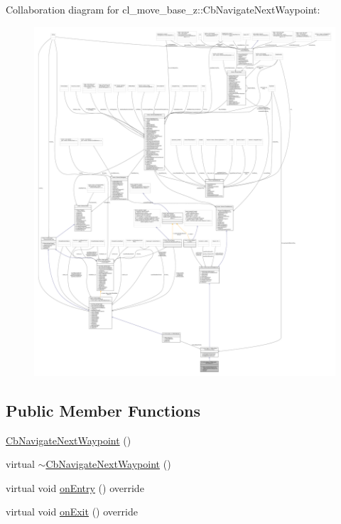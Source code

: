 Collaboration diagram for cl\+\_\+move\+\_\+base\+\_\+z\+:\+:Cb\+Navigate\+Next\+Waypoint\+:
\nopagebreak
\begin{figure}[H]
\begin{center}
\leavevmode
\includegraphics[width=350pt]{classcl__move__base__z_1_1CbNavigateNextWaypoint__coll__graph}
\end{center}
\end{figure}
\subsection*{Public Member Functions}
\begin{DoxyCompactItemize}
\item 
\hyperlink{classcl__move__base__z_1_1CbNavigateNextWaypoint_ae76bae37ab364bf6f48b8a200dd63ced}{Cb\+Navigate\+Next\+Waypoint} ()
\item 
virtual \hyperlink{classcl__move__base__z_1_1CbNavigateNextWaypoint_a35a4ab32307256f3e0a6433efb336227}{$\sim$\+Cb\+Navigate\+Next\+Waypoint} ()
\item 
virtual void \hyperlink{classcl__move__base__z_1_1CbNavigateNextWaypoint_a04913ef24344363669c1916b5df28493}{on\+Entry} () override
\item 
virtual void \hyperlink{classcl__move__base__z_1_1CbNavigateNextWaypoint_a1a848f7bfedd23fea7de59a940257b05}{on\+Exit} () override
\end{DoxyCompactItemize}
